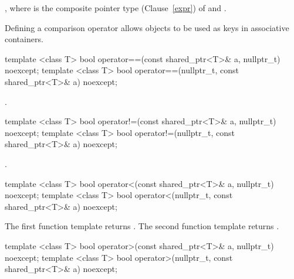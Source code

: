 \begin{itemdescr}
\pnum\returns {},
where  is the composite pointer type (Clause~\ref{expr}) of  and .

\pnum \begin{note}
Defining a comparison operator allows  objects to be
used as keys in associative containers.
\end{note}

\end{itemdescr}

%
\begin{itemdecl}
template <class T>
  bool operator==(const shared_ptr<T>& a, nullptr_t) noexcept;
template <class T>
  bool operator==(nullptr_t, const shared_ptr<T>& a) noexcept;
\end{itemdecl}

\begin{itemdescr}
\pnum
\returns {}.
\end{itemdescr}

%
\begin{itemdecl}
template <class T>
  bool operator!=(const shared_ptr<T>& a, nullptr_t) noexcept;
template <class T>
  bool operator!=(nullptr_t, const shared_ptr<T>& a) noexcept;
\end{itemdecl}

\begin{itemdescr}
\pnum
\returns {}.
\end{itemdescr}

%
\begin{itemdecl}
template <class T>
  bool operator<(const shared_ptr<T>& a, nullptr_t) noexcept;
template <class T>
  bool operator<(nullptr_t, const shared_ptr<T>& a) noexcept;
\end{itemdecl}

\begin{itemdescr}
\pnum
\returns
The first function template returns
.
The second function template returns
.
\end{itemdescr}

%
\begin{itemdecl}
template <class T>
  bool operator>(const shared_ptr<T>& a, nullptr_t) noexcept;
template <class T>
  bool operator>(nullptr_t, const shared_ptr<T>& a) noexcept;
\end{itemdecl}

